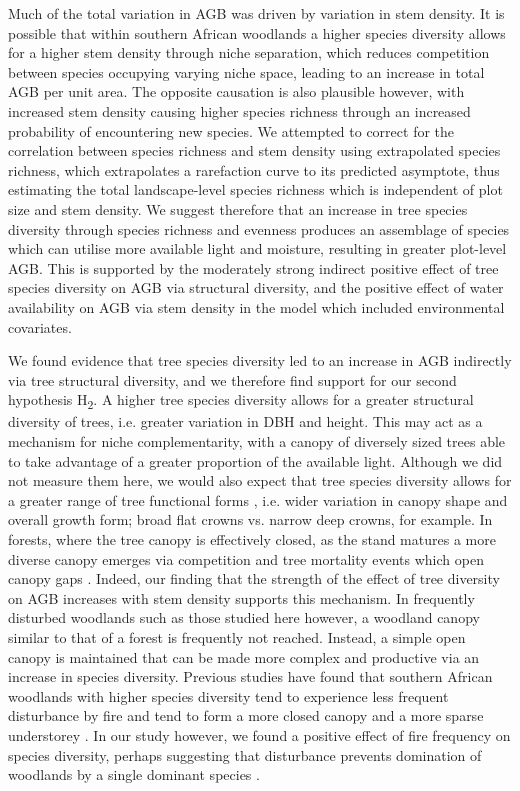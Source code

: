 \documentclass[11pt,a4paper]{article}
\begin{document}
Much of the total variation in AGB was driven by variation in stem density. It is possible that within southern African woodlands a higher species diversity allows for a higher stem density through niche separation, which reduces competition between species occupying varying niche space, leading to an increase in total AGB per unit area. The opposite causation is also plausible however, with increased stem density causing higher species richness through an increased probability of encountering new species. We attempted to correct for the correlation between species richness and stem density using extrapolated species richness, which extrapolates a rarefaction curve to its predicted asymptote, thus estimating the total landscape-level species richness which is independent of plot size and stem density. We suggest therefore that an increase in tree species diversity through species richness and evenness produces an assemblage of species which can utilise more available light and moisture, resulting in greater plot-level AGB. This is supported by the moderately strong indirect positive effect of tree species diversity on AGB via structural diversity, and the positive effect of water availability on AGB via stem density in the model which included environmental covariates. 

We found evidence that tree species diversity led to an increase in AGB indirectly via tree structural diversity, and we therefore find support for our second hypothesis H\textsubscript{2}. A higher tree species diversity allows for a greater structural diversity of trees, i.e. greater variation in DBH and height. This may act as a mechanism for niche complementarity, with a canopy of diversely sized trees able to take advantage of a greater proportion of the available light. Although we did not measure them here, we would also expect that tree species diversity allows for a greater range of tree functional forms \citep{Pretzsch2014}, i.e. wider variation in canopy shape and overall growth form; broad flat crowns vs. narrow deep crowns, for example. In forests, where the tree canopy is effectively closed, as the stand matures a more diverse canopy emerges via competition and tree mortality events which open canopy gaps \citep{Muscolo2014}. Indeed, our finding that the strength of the effect of tree diversity on AGB increases with stem density supports this mechanism. In frequently disturbed woodlands such as those studied here however, a woodland canopy similar to that of a forest is frequently not reached. Instead, a simple open canopy is maintained that can be made more complex and productive via an increase in species diversity. Previous studies have found that southern African woodlands with higher species diversity tend to experience less frequent disturbance by fire and tend to form a more closed canopy and a more sparse understorey \citep{Chidumayo2013, Mutowo2012}. In our study however, we found a positive effect of fire frequency on species diversity, perhaps suggesting that disturbance prevents domination of woodlands by a single dominant species \citep{Chidumayo2013}.
\end{document}
